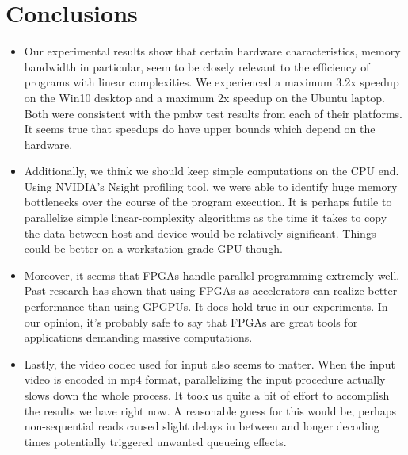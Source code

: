 \documentclass{acm_proc_article-sp}
\begin{document}
\section{Conclusions}
\begin{itemize}
\item Our experimental results show that certain hardware characteristics, memory bandwidth in particular, seem to be closely relevant to the efficiency of programs with linear complexities. We experienced a maximum 3.2x speedup on the Win10 desktop and a maximum 2x speedup on the Ubuntu laptop. Both were consistent with the pmbw test results from each of their platforms. It seems true that speedups do have upper bounds which depend on the hardware.
\item Additionally, we think we should keep simple computations on the CPU end. Using NVIDIA's Nsight profiling tool, we were able to identify huge memory bottlenecks over the course of the program execution. It is perhaps futile to parallelize simple linear-complexity algorithms as the time it takes to copy the data between host and device would be relatively significant. Things could be better on a workstation-grade GPU though.
\item Moreover, it seems that FPGAs handle parallel programming extremely well. Past research has  shown that using FPGAs as accelerators can realize better performance than using GPGPUs. It does hold true in our experiments. In our opinion, it's probably safe to say that FPGAs are great tools for applications demanding massive computations.
\item Lastly, the video codec used for input also seems to matter. When the input video is encoded in mp4 format, parallelizing the input procedure actually slows down the whole process. It took us quite a bit of effort to accomplish the results we have right now. A reasonable guess for this would be, perhaps non-sequential reads caused slight delays in between and longer decoding times potentially triggered unwanted queueing effects.
\end{itemize}
\end{document}
